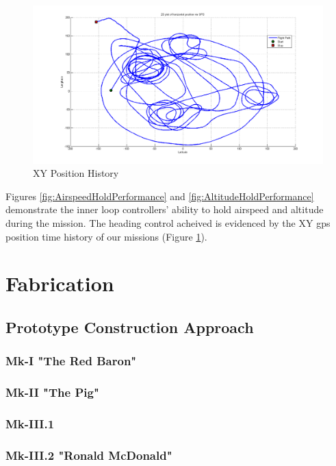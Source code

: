 \documentclass[11pt]{article}
\begin{document}
\begin{figure}[h!]
\centering
\includegraphics[width=\textwidth]{./Figures/PositionHistory}
\caption{XY Position History}
\label{fig:PositionHistory}
\end{figure}


Figures \ref{fig:AirspeedHoldPerformance} and \ref{fig:AltitudeHoldPerformance} demonstrate the inner loop controllers' ability to hold airspeed and altitude during the mission. The heading control acheived is evidenced by the XY gps position time history of our missions (Figure \ref{fig:PositionHistory}).

\FloatBarrier
\section{Fabrication}
	\label{Fabrication}
	\subsection{Prototype Construction Approach}
	\label{ProtoConsAppr}
	\subsubsection{Mk-I "The Red Baron"}
	\label{mk1}
	\subsubsection{Mk-II "The Pig"}
	\label{mk2}
	\subsubsection{Mk-III.1}
	\label{mk3.1}
	\subsubsection{Mk-III.2 "Ronald McDonald"}
	\label{mk3.2}
\end{document}
